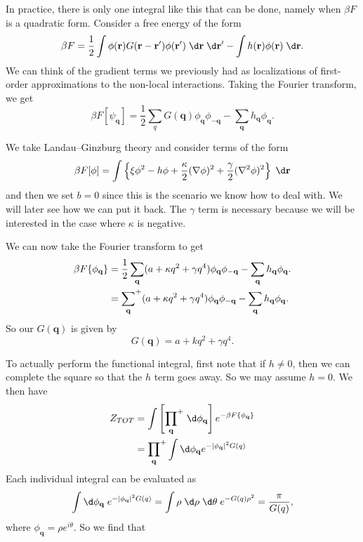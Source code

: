 \documentclass[a4paper]{article}
\newcommand\splus{\!{\vphantom{\prod}}^+}
\begin{document}
In practice, there is only one integral like this that can be done, namely when $\beta F$ is a quadratic form. Consider a free energy of the form
\[
  \beta F = \frac{1}{2} \int \phi(\mathbf{r}) G(\mathbf{r} - \mathbf{r}') \phi(\mathbf{r}')\;\d \mathbf{r}\;\d \mathbf{r}' - \int h(\mathbf{r}) \phi(\mathbf{r})\;\d \mathbf{r}.
\]
We can think of the gradient terms we previously had as localizations of first-order approximations to the non-local interactions. Taking the Fourier transform, we get
\[
  \beta F[\psi_\mathbf{q}] = \frac{1}{2} \sum_q G(\mathbf{q}) \phi_\mathbf{q} \phi_{-\mathbf{q}} - \sum_\mathbf{q} h_\mathbf{q} \phi_\mathbf{q}.
\]
\begin{eg}
  We take Landau--Ginzburg theory and consider terms of the form
  \[
    \beta F[\phi] = \int \left\{\xi \phi^2 - h \phi + \frac{\kappa}{2} (\nabla \phi)^2 + \frac{\gamma}{2} (\nabla^2 \phi)^2\right\}\;\d \mathbf{r}
  \]
  and then we set $b = 0$ since this is the scenario we know how to deal with. We will later see how we can put it back. The $\gamma$ term is necessary because we will be interested in the case where $\kappa$ is negative.

  We can now take the Fourier transform to get
  \begin{align*}
    \beta F \{\phi_\mathbf{q}\} &= \frac{1}{2} \sum_\mathbf{q} (a + \kappa q^2 + \gamma q^4) \phi_\mathbf{q} \phi_{-\mathbf{q}} - \sum_\mathbf{q} h_\mathbf{q} \phi_\mathbf{q}.\\
    &= \sum_\mathbf{q}\splus (a + \kappa q^2 + \gamma q^4) \phi_\mathbf{q} \phi_{-\mathbf{q}} - \sum_\mathbf{q} h_\mathbf{q} \phi_\mathbf{q}.
  \end{align*}
  So our $G(\mathbf{q})$ is given by
  \[
    G(\mathbf{q}) = a + k q^2 + \gamma q^4.
  \]
\end{eg}
To actually perform the functional integral, first note that if $h \not= 0$, then we can complete the square so that the $h$ term goes away. So we may assume $h = 0$. We then have
\begin{align*}
  Z_{TOT} &= \int \left[ \prod_{\mathbf{q}}\splus \;\d \phi_\mathbf{q}\right] e^{-\beta F\{\phi_\mathbf{q}\}}\\
  &= \prod_\mathbf{q}\splus \int \d \phi_\mathbf{q} e^{-|\phi_\mathbf{q}|^2 G(q)}
\end{align*}
Each individual integral can be evaluated as
\[
  \int \d \phi_\mathbf{q}\;e^{-|\phi_\mathbf{q}|^2 G(q)} = \int \rho \;\d \rho \;\d \theta\; e^{-G(q) \rho^2} = \frac{\pi}{G(q)},
\]
where $\phi_\mathbf{q} = \rho e^{i\theta}$. So we find that
\end{document}
